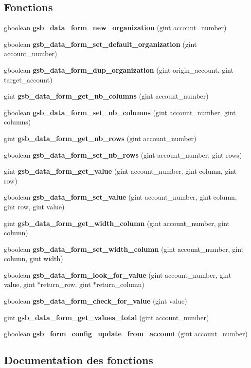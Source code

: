 \subsection*{Fonctions}
\begin{DoxyCompactItemize}
\item 
gboolean {\bf gsb\_\-data\_\-form\_\-new\_\-organization} (gint account\_\-number)
\item 
gboolean {\bf gsb\_\-data\_\-form\_\-set\_\-default\_\-organization} (gint account\_\-number)
\item 
gboolean {\bf gsb\_\-data\_\-form\_\-dup\_\-organization} (gint origin\_\-account, gint target\_\-account)
\item 
gint {\bf gsb\_\-data\_\-form\_\-get\_\-nb\_\-columns} (gint account\_\-number)
\item 
gboolean {\bf gsb\_\-data\_\-form\_\-set\_\-nb\_\-columns} (gint account\_\-number, gint columns)
\item 
gint {\bf gsb\_\-data\_\-form\_\-get\_\-nb\_\-rows} (gint account\_\-number)
\item 
gboolean {\bf gsb\_\-data\_\-form\_\-set\_\-nb\_\-rows} (gint account\_\-number, gint rows)
\item 
gint {\bf gsb\_\-data\_\-form\_\-get\_\-value} (gint account\_\-number, gint column, gint row)
\item 
gboolean {\bf gsb\_\-data\_\-form\_\-set\_\-value} (gint account\_\-number, gint column, gint row, gint value)
\item 
gint {\bf gsb\_\-data\_\-form\_\-get\_\-width\_\-column} (gint account\_\-number, gint column)
\item 
gboolean {\bf gsb\_\-data\_\-form\_\-set\_\-width\_\-column} (gint account\_\-number, gint column, gint width)
\item 
gboolean {\bf gsb\_\-data\_\-form\_\-look\_\-for\_\-value} (gint account\_\-number, gint value, gint $\ast$return\_\-row, gint $\ast$return\_\-column)
\item 
gboolean {\bf gsb\_\-data\_\-form\_\-check\_\-for\_\-value} (gint value)
\item 
gint {\bf gsb\_\-data\_\-form\_\-get\_\-values\_\-total} (gint account\_\-number)
\item 
gboolean {\bf gsb\_\-form\_\-config\_\-update\_\-from\_\-account} (gint account\_\-number)
\end{DoxyCompactItemize}


\subsection{Documentation des fonctions}

